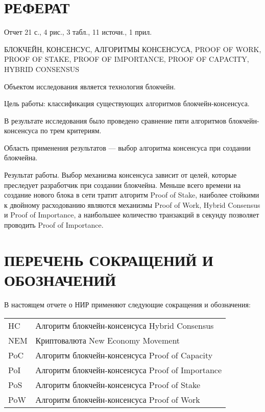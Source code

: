 





{\centering \chapter*{РЕФЕРАТ}}

Отчет 21 с., 4 рис., 3 табл., 11 источн., 1 прил.

\noindent БЛОКЧЕЙН, КОНСЕНСУС, АЛГОРИТМЫ КОНСЕНСУСА, PROOF OF WORK, PROOF OF STAKE, PROOF OF IMPORTANCE, PROOF OF CAPACITY, HYBRID CONSENSUS

Объектом исследования является технология блокчейн.

Цель работы: классификация существующих алгоритмов блокчейн-консенсуса.

В результате исследования было проведено сравнение пяти алгоритмов блокчейн-консенсуса по трем критериям.

Область применения результатов --- выбор алгоритма консенсуса при создании блокчейна.

Результат работы. 
Выбор механизма консенсуса зависит от целей, которые преследует разработчик при создании блокчейна. 
Меньше всего времени на создание нового блока в сети тратит алгоритм Proof of Stake, наиболее стойкими к двойному расходованию являются механизмы Proof of Work, Hybrid Consensus и Proof of Importance, а наибольшее количество транзакций в секунду позволяет проводить Proof of Importance.

\maketableofcontents

{\centering \chapter*{ПЕРЕЧЕНЬ СОКРАЩЕНИЙ И ОБОЗНАЧЕНИЙ}}

В настоящем отчете о НИР применяют следующие сокращения и обозначения:

\begin{table}[H]
\begin{tabular}{p{3cm}p{13.5cm}}
HC & Алгоритм блокчейн-консенсуса Hybrid Consensus
\tabularnewline
NEM & Криптовалюта New Economy Movement
\tabularnewline
PoC & Алгоритм блокчейн-консенсуса Proof of Capacity
\tabularnewline
PoI & Алгоритм блокчейн-консенсуса Proof of Importance
\tabularnewline
PoS & Алгоритм блокчейн-консенсуса Proof of Stake
\tabularnewline
PoW & Алгоритм блокчейн-консенсуса Proof of Work
\tabularnewline
\end{tabular}
\end{table}

